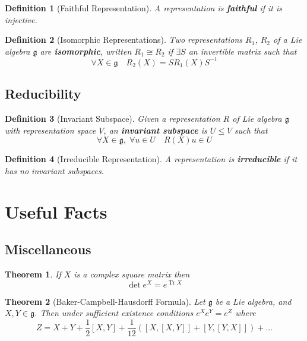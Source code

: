 \documentclass{article}
\newtheorem{theorem}{Theorem}[section]
\newtheorem{definition}{Definition}[subsection]
\DeclareMathOperator{\tr}{Tr}
\newcommand{\bam}[1]{\textbf{#1}}
\newcommand{\mf}[1]{\mathfrak{#1}}
\newcommand{\comm}[2][]{\left[ #1, #2 \right]}
\begin{document}
\begin{definition}[Faithful Representation]
A representation is \bam{faithful} if it is injective. 
\end{definition}

\begin{definition}[Isomorphic Representations]
Two representations $R_1$, $R_2$ of a Lie algebra $\mf{g}$ are \bam{isomorphic}, written $R_1 \cong R_2$ if $\exists S$ an invertible matrix such that 
\[
\forall X\in\mf{g} \quad R_2\left(X\right)=S R_1\left(X\right) S^{-1}
\]
\end{definition}

\subsection{Reducibility}
\begin{definition}[Invariant Subspace]
Given a representation $R$ of Lie algebra $\mf{g}$ with representation space $V$, an \bam{invariant subspace} is $U\leq V$ such that
\[
\forall X\in\mf{g}, \; \forall u\in U \quad R\left(X\right)u\in U
\]
\end{definition}

\begin{definition}[Irreducible Representation]
A representation is \bam{irreducible} if it has no invariant subspaces. 
\end{definition}

\section{Useful Facts}

\subsection{Miscellaneous}
\begin{theorem}
If $X$ is a complex square matrix then 
\[
\det{e^X}=e^{\tr{X}}
\]
\end{theorem}

\begin{theorem}[Baker-Campbell-Hausdorff Formula]
Let $\mf{g}$ be a Lie algebra, and $X,Y\in\mf{g}$. Then under sufficient existence conditions $e^X e^Y=e^Z$ where
\[
Z=X+Y+\frac{1}{2}\comm[X]{Y}+\frac{1}{12}\left(\comm[X]{\comm[X]{Y}}+\comm[Y]{\comm[Y]{X}}\right)+\dots
\]
\end{theorem}
\end{document}
